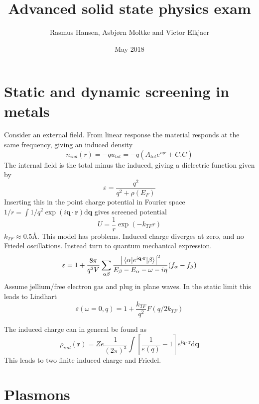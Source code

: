 \documentclass{article}
\title{Advanced solid state physics exam}
\author{Rasmus Hansen, Asbjørn Moltke and Victor Elkjaer}
\date{May 2018}
\begin{document}
\maketitle

\section{Static and dynamic screening in metals}
Consider an external field. From linear response the material responds at the same frequency, giving an induced density
\begin{equation}
    n_{ind}(r) = -q u_{tot} = -q(A_{tot}e^{iqr}+C.C)
\end{equation}
The internal field is the total minus the induced, giving a dielectric function given by
\begin{equation}
    \varepsilon = \frac{q^2}{q^2+\rho(E_F)}
\end{equation}
Inserting this in the point charge potential in Fourier space $1/r = \int 1/q^2 \exp(i\mathbf{q} \cdot \mathbf{r}) \mathrm{d} \mathbf{q}$ gives screened potential
\begin{equation}
   U= \frac{1}{r} \exp(- k_{TF} r)
\end{equation}
$k_{TF} \approx 0.5 Å$. This model has problems. Induced charge diverges at zero, and no Friedel oscillations. Instead turn to quantum mechanical expression.
\begin{equation}
    \varepsilon = 1 + \frac{8 \pi}{q^2 V} \sum_{\alpha \beta} \frac{\abs{\mel{\alpha}{e^{i\mathbf{q} \cdot \mathbf{r}}}{\beta}}^2}{E_{\beta}-E_{\alpha}-\omega - i \eta}(f_{\alpha}-f_{\beta})
\end{equation}
Assume jellium/free electron gas and plug in plane waves. In the static limit this leads to Lindhart
\begin{equation}
    \varepsilon(\omega=0,q) = 1 + \frac{k_{TF}}{q^2}F(q/2k_{TF})
\end{equation}

The induced charge can in general be found as
\begin{equation}
    \rho_{ind}(\mathbf{r}) = Z e \frac{1}{(2 \pi)^3} \int \left[ \frac{1}{\varepsilon(q)}-1 \right] e^{i \mathbf{q} \cdot \mathbf{r}} \mathrm{d} \mathbf{q}
\end{equation}
This leads to two finite induced charge and Friedel.



\newpage
\section{Plasmons}
\end{document}

